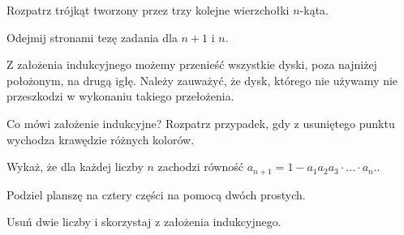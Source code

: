 \newpage
{}

\begin{hints_list}

	\item Rozpatrz trójkąt tworzony przez trzy kolejne wierzchołki $n$-kąta.

	\item Odejmij stronami tezę zadania dla $n + 1$ i $n$.

	\item Z założenia indukcyjnego możemy przenieść wszystkie dyski, poza najniżej położonym, na drugą igłę. Należy zauważyć, że dysk, którego nie używamy nie przeszkodzi w wykonaniu takiego przełożenia.

	\item Co mówi założenie indukcyjne? Rozpatrz przypadek, gdy z usuniętego punktu wychodza krawędzie różnych kolorów.

	\item Wykaż, że dla każdej liczby $n$ zachodzi równość $a_{n + 1} = 1 - a_1a_2a_3\cdot ... \cdot a_{n}.$.

	\item Podziel planszę na cztery części na pomocą dwóch prostych.

	\item Usuń dwie liczby i skorzystaj z założenia indukcyjnego.
\end{hints_list}